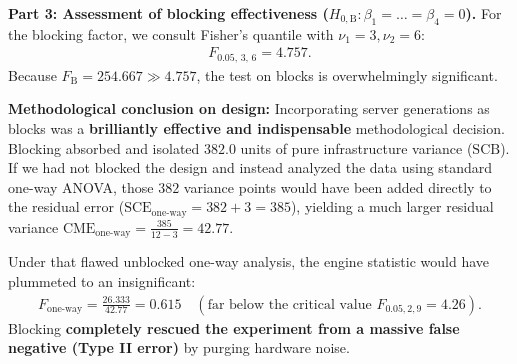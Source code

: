 \begin{solproblema}
	\textbf{Part 3: Assessment of blocking effectiveness ($H_{0,\text{B}}: \beta_1 = \ldots = \beta_4 = 0$).}
	For the blocking factor, we consult Fisher's quantile with $\nu_1 = 3, \nu_2 = 6$:
	\begin{align}
		F_{0.05, \, 3, \, 6} = 4.757.
	\end{align}
	Because $F_{\text{B}} = 254.667 \gg 4.757$, the test on blocks is overwhelmingly significant.
	
	\textbf{Methodological conclusion on design:} Incorporating server generations as blocks was a \textbf{brilliantly effective and indispensable} methodological decision. Blocking absorbed and isolated $382.0$ units of pure infrastructure variance ($\text{SCB}$). If we had not blocked the design and instead analyzed the data using standard one-way ANOVA, those $382$ variance points would have been added directly to the residual error ($\text{SCE}_{\text{one-way}} = 382 + 3 = 385$), yielding a much larger residual variance $\text{CME}_{\text{one-way}} = \frac{385}{12-3} = 42.77$.
	
	Under that flawed unblocked one-way analysis, the engine statistic would have plummeted to an insignificant:
	\begin{align}
		F_{\text{one-way}} = \frac{26.333}{42.77} = 0.615 \quad (\text{far below the critical value } F_{0.05, 2, 9} = 4.26).
	\end{align}
	Blocking \textbf{completely rescued the experiment from a massive false negative (Type II error)} by purging hardware noise.
\end{solproblema}

